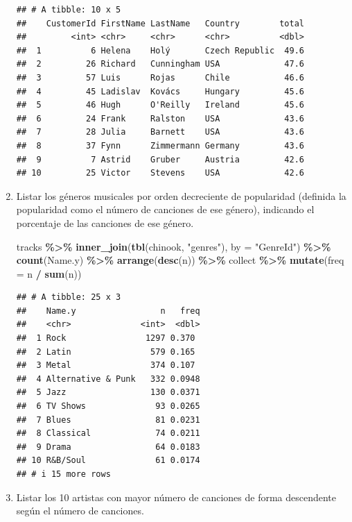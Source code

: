 \documentclass[
]{book}
\newenvironment{Shaded}{\begin{snugshade}}{\end{snugshade}}
\newcommand{\AttributeTok}[1]{\textcolor[rgb]{0.13,0.29,0.53}{#1}}
\newcommand{\FunctionTok}[1]{\textcolor[rgb]{0.13,0.29,0.53}{\textbf{#1}}}
\newcommand{\NormalTok}[1]{#1}
\newcommand{\SpecialCharTok}[1]{\textcolor[rgb]{0.81,0.36,0.00}{\textbf{#1}}}
\newcommand{\StringTok}[1]{\textcolor[rgb]{0.31,0.60,0.02}{#1}}
\begin{document}
\begin{enumerate}
\begin{verbatim}
## # A tibble: 10 x 5
##    CustomerId FirstName LastName   Country        total
##         <int> <chr>     <chr>      <chr>          <dbl>
##  1          6 Helena    Holý       Czech Republic  49.6
##  2         26 Richard   Cunningham USA             47.6
##  3         57 Luis      Rojas      Chile           46.6
##  4         45 Ladislav  Kovács     Hungary         45.6
##  5         46 Hugh      O'Reilly   Ireland         45.6
##  6         24 Frank     Ralston    USA             43.6
##  7         28 Julia     Barnett    USA             43.6
##  8         37 Fynn      Zimmermann Germany         43.6
##  9          7 Astrid    Gruber     Austria         42.6
## 10         25 Victor    Stevens    USA             42.6
\end{verbatim}
\item
  Listar los géneros musicales por orden decreciente de popularidad
  (definida la popularidad como el número de canciones de ese género),
  indicando el porcentaje de las canciones de ese género.

\begin{Shaded}
\begin{Highlighting}[]
\NormalTok{tracks }\SpecialCharTok{\%\textgreater{}\%} \FunctionTok{inner\_join}\NormalTok{(}\FunctionTok{tbl}\NormalTok{(chinook, }\StringTok{"genres"}\NormalTok{), }\AttributeTok{by =} \StringTok{"GenreId"}\NormalTok{) }\SpecialCharTok{\%\textgreater{}\%} \FunctionTok{count}\NormalTok{(Name.y) }\SpecialCharTok{\%\textgreater{}\%} 
    \FunctionTok{arrange}\NormalTok{(}\FunctionTok{desc}\NormalTok{(n)) }\SpecialCharTok{\%\textgreater{}\%}\NormalTok{ collect }\SpecialCharTok{\%\textgreater{}\%} \FunctionTok{mutate}\NormalTok{(}\AttributeTok{freq =}\NormalTok{ n }\SpecialCharTok{/} \FunctionTok{sum}\NormalTok{(n))}
\end{Highlighting}
\end{Shaded}

\begin{verbatim}
## # A tibble: 25 x 3
##    Name.y                 n   freq
##    <chr>              <int>  <dbl>
##  1 Rock                1297 0.370 
##  2 Latin                579 0.165 
##  3 Metal                374 0.107 
##  4 Alternative & Punk   332 0.0948
##  5 Jazz                 130 0.0371
##  6 TV Shows              93 0.0265
##  7 Blues                 81 0.0231
##  8 Classical             74 0.0211
##  9 Drama                 64 0.0183
## 10 R&B/Soul              61 0.0174
## # i 15 more rows
\end{verbatim}
\item
  Listar los 10 artistas con mayor número de canciones
  de forma descendente según el número de canciones.


\end{enumerate}
\end{document}
